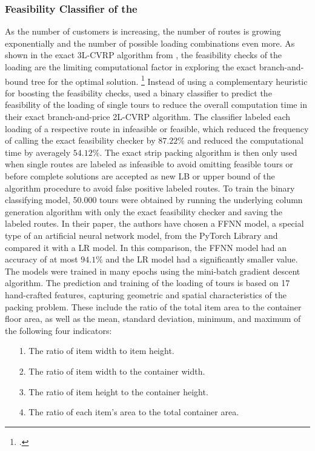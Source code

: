 \subsubsection{Feasibility Classifier of the }
As the number of customers is increasing, the number of routes is growing exponentially and the number of
possible loading combinations even more. As shown in the exact \gls{3L-CVRP} algorithm from \cite{tamke_branch-and-cut_2024},
the feasibility checks of the loading are the limiting computational factor in
exploring the exact branch-and-bound tree for the optimal solution. \footcite[cf.][p. 22]{tamke_branch-and-cut_2024}
Instead of using a complementary heuristic for boosting the feasibility checks,
\textcite{zhang_learning-based_2022} used a binary classifier to predict the feasibility of the
loading of single tours to reduce the overall computation time in their exact branch-and-price \gls{2L-CVRP}
algorithm. The classifier labeled each loading of a respective route in infeasible or feasible, which
reduced the frequency of calling the exact feasibility checker by $87.22\%$ and reduced the computational time by averagely $54.12\%$.
The exact strip packing algorithm is then only used when single routes are labeled as infeasible to avoid
omitting feasible tours or before complete solutions are accepted as new \gls{LB} or upper bound of the
algorithm procedure to avoid false positive labeled routes. To train the binary classifying model,
50.000 tours were obtained by running the underlying column generation
algorithm with only the exact feasibility checker and saving the labeled routes.
In their paper, the authors have chosen a \gls{FFNN} model, a special type of an artificial neural network model,
from the PyTorch Library and compared it with a \gls{LR} model. In this comparison, the \gls{FFNN} model had
an accuracy of at most $94.1\%$ and the \gls{LR} model had a significantly smaller value.
The models were trained in many epochs using the mini-batch gradient descent algorithm. The prediction and training
of the loading of tours is based on 17 hand-crafted features, capturing geometric
and spatial characteristics of the packing problem. These include the ratio of the total item area
to the container floor area, as well as the mean, standard deviation, minimum, and maximum of
the following four indicators:
\begin{itemize}
	\item[1.] The ratio of item width to item height.
	\item[2.] The ratio of item width to the container width.
	\item[3.] The ratio of item height to the container height.
	\item[4.] The ratio of each item’s area to the total container area.
\end{itemize}

